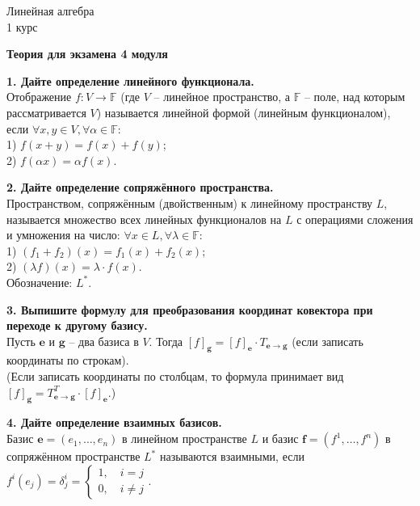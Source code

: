\documentclass[11pt,a4paper]{article}
\newcommand{\F}{\mathbb{F}}
\newcommand{\e}{\mathbf{e}}
\renewcommand{\f}{\mathbf{f}}
\newcommand{\g}{\mathbf{g}}
\begin{document}
\begin{center}

\begin{huge}
\textsf{Линейная алгебра\\1 курс}
\end{huge}

\vspace{5mm}

\begin{LARGE}
\textsf{\textbf{Теория для экзамена 4 модуля}}
\end{LARGE}

\end{center}

\textbf{1. Дайте определение линейного функционала.\\}
Отображение $f : V \rightarrow \mathbb{F}$ (где $V$ -- линейное пространство, а $\F$ -- поле, над которым рассматривается $V$) называется линейной формой (линейным функционалом), если $\forall x, y \in V, \forall \alpha \in \F$:\\
1) $f (x + y) = f(x) + f(y)$;\\
2) $f (\alpha x) = \alpha f(x)$.

\textbf{2. Дайте определение сопряжённого пространства.\\}
Пространством, сопряжённым (двойственным) к линейному пространству $L$, называется множество всех линейных функционалов на $L$ с операциями сложения и умножения на число: $\forall x \in L, \forall \lambda \in \F$:\\
1) $(f_1 + f_2) (x) = f_1 (x) + f_2 (x)$;\\
2) $(\lambda f) (x) = \lambda \cdot f(x)$.\\
Обозначение: $L^*$.

\textbf{3. Выпишите формулу для преобразования координат ковектора при переходе к другому базису.\\}
Пусть $\e$ и $\g$ -- два базиса в $V$. Тогда $[f]_{\g} = [f]_{\e} \cdot T_{\e \rightarrow \g}$ (если записать координаты по строкам).\\
(Если записать координаты по столбцам, то формула принимает вид $[f]_{\g} = T^T_{\e \rightarrow \g} \cdot [f]_{\e}$.)

\textbf{4. Дайте определение взаимных базисов.\\}
Базис $\e = (e_1, \hdots, e_n)$ в линейном пространстве $L$ и базис $\f = (f^1, \hdots, f^n)$ в сопряжённом пространстве $L^*$ называются взаимными, если $f^i (e_j) = \delta_j^i = \begin{cases*}
1, \quad i = j\\
0, \quad i \neq j
\end{cases*}.$
\end{document}

